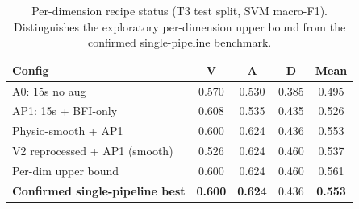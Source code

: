 \documentclass[sigconf,nonacm]{acmart}
\newcommand{\best}[1]{\textbf{\textcolor{bestcol}{#1}}}
\begin{document}
\begin{table}[t]
\caption{Per-dimension recipe status (T3 test split, SVM macro-F1).
  Distinguishes the exploratory per-dimension upper bound from the confirmed
  single-pipeline benchmark.}
\label{tab:perdim}
\centering
\setlength{\tabcolsep}{4pt}
\small
\begin{tabular}{lcccc}
\toprule
\textbf{Config} & \textbf{V} & \textbf{A} & \textbf{D} & \textbf{Mean} \\
\midrule
A0: 15s no aug                & 0.570 & 0.530 & 0.385 & 0.495 \\
AP1: 15s + BFI-only           & 0.608 & 0.535 & 0.435 & 0.526 \\
Physio-smooth + AP1           & 0.600 & 0.624 & 0.436 & 0.553 \\
V2 reprocessed + AP1 (smooth) & 0.526 & 0.624 & 0.460 & 0.537 \\
\midrule
Per-dim upper bound           & 0.600 & 0.624 & 0.460 & 0.561 \\
\best{Confirmed single-pipeline best} & \best{0.600} & \best{0.624} & 0.436 & \best{0.553} \\
\bottomrule
\end{tabular}
\end{table}
\end{document}
